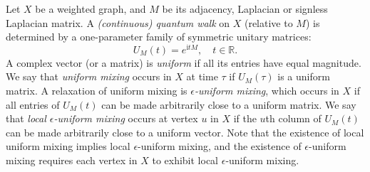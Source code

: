\documentclass[11pt]{article}
\def\ii{\mathrm{i}}
\def\R{\mathbb{R}}
\begin{document}
Let $X$ be a weighted graph, and $M$ be its adjacency, Laplacian or signless Laplacian matrix. A \textit{(continuous) quantum walk} on $X$ (relative to $M$) is determined by a one-parameter family of symmetric unitary matrices:
\begin{equation*}
\label{U}
U_M(t)=e^{\ii tM},\quad t\in\R.
\end{equation*}
A complex vector (or a matrix) is \textit{uniform} if all its entries have equal magnitude. We say that \textit{uniform mixing} occurs in $X$ at time $\tau$ if $U_M(\tau)$ is a uniform matrix. A relaxation of uniform mixing is \textit{$\epsilon$-uniform mixing}, which occurs in $X$ if all entries of $U_M(t)$ can be made arbitrarily close to a uniform matrix. We say that
\textit{local $\epsilon$-uniform mixing} occurs at vertex $u$ in $X$ if the $u$th column of $U_M(t)$ can be made arbitrarily close to a uniform vector. Note that the existence of local uniform mixing  implies local $\epsilon$-uniform mixing, and the existence of $\epsilon$-uniform mixing requires each vertex in $X$ to exhibit local $\epsilon$-uniform mixing. 
\end{document}
